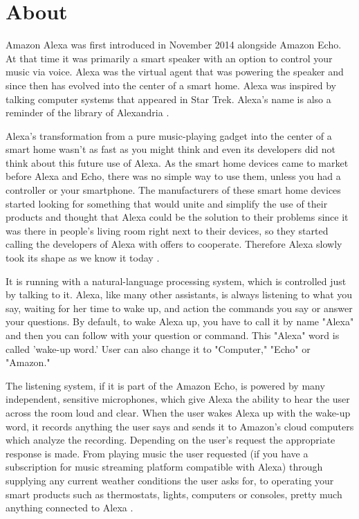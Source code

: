 \documentclass[
  digital, %
  oneside, %
  table,   %
  lof,     %
  lot,     %
]{fithesis3}
\begin{document}
\section{About}

Amazon Alexa was first introduced in November 2014 alongside Amazon Echo. At that time it was primarily a smart speaker with an option to control your music via voice. Alexa was the virtual agent that was powering the speaker and since then has evolved into the center of a smart home. Alexa was inspired by talking computer systems that appeared in Star Trek. Alexa's name is also a reminder of the library of Alexandria \parencite{alexa_name}.

Alexa's transformation from a pure music-playing gadget into the center of a smart home wasn't as fast as you might think and even its developers did not think about this future use of Alexa. As the smart home devices came to market before Alexa and Echo, there was no simple way to use them, unless you had a controller or your smartphone. The manufacturers of these smart home devices started looking for something that would unite and simplify the use of their products and thought that Alexa could be the solution to their problems since it was there in people's living room right next to their devices, so they started calling the developers of Alexa with offers to cooperate. Therefore Alexa slowly took its shape as we know it today \parencite{alexa_businessinsider}.

It is running with a natural-language processing system, which is controlled just by talking to it. Alexa, like many other assistants, is always listening to what you say, waiting for her time to wake up, and action the commands you say or answer your questions. By default, to wake Alexa up, you have to call it by name "Alexa" and then you can follow with your question or command. This "Alexa" word is called 'wake-up word.' User can also change it to "Computer," "Echo" or "Amazon." 

The listening system, if it is part of the Amazon Echo, is powered by many independent, sensitive microphones, which give Alexa the ability to hear the user across the room loud and clear. When the user wakes Alexa up with the wake-up word, it records anything the user says and sends it to Amazon's cloud computers which analyze the recording. Depending on the user's request the appropriate response is made. From playing music the user requested (if you have a subscription for music streaming platform compatible with Alexa) through supplying any current weather conditions the user asks for, to operating your smart products such as thermostats, lights, computers or consoles, pretty much anything connected to Alexa \parencite{alexa_wirecutter}.
\end{document}
